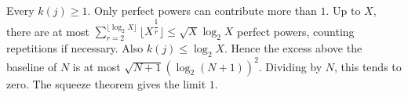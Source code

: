 Every $k(j)\ge1$. Only perfect powers can contribute more than $1$. Up to $X$, there are at most $\sum_{r=2}^{\lfloor\log_2X\rfloor} \lfloor X^{\dfrac{1}{r}} \rfloor \le \sqrt{X} \log_2 X$ perfect powers, counting repetitions if necessary. Also $k(j)\le\log_2X$. Hence the excess above the baseline of $N$ is at most $\sqrt{N+1}(\log_2(N+1))^2$. Dividing by $N$, this tends to zero. The squeeze theorem gives the limit $\boxed1$.
